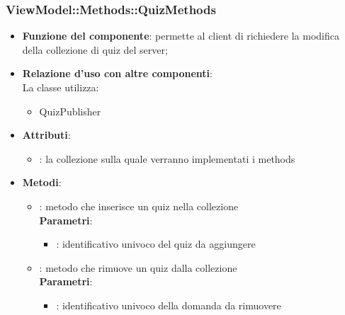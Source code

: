 \subsubsection{ViewModel::Methods::QuizMethods}
\begin{itemize}
\item\textbf{Funzione del componente}: permette al client di richiedere la modifica della collezione di quiz del server;
	\item\textbf{Relazione d'uso con altre componenti}: \\
La classe utilizza:
	\begin{itemize}
		\item QuizPublisher
	\end{itemize}
\item\textbf{Attributi}:
	\begin{itemize}
		\item{}: la collezione sulla quale verranno implementati i methods\\
	\end{itemize}
\item\textbf{Metodi}:
	\begin{itemize}
		\item{}: metodo che inserisce un quiz nella collezione\\
		\textbf{Parametri}:
			\begin{itemize}
				\item{}: identificativo univoco del quiz da aggiungere\\
			\end{itemize}
		\item{}: metodo che rimuove un quiz dalla collezione\\
		\textbf{Parametri}:
			\begin{itemize}
				\item{}: identificativo univoco della domanda da rimuovere\\
			\end{itemize}
	\end{itemize}
\end{itemize}

